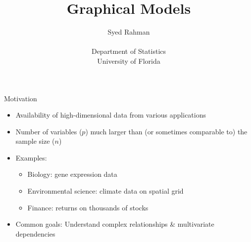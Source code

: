 \documentclass[xcolor=dvipsnames,aspectratio=1610]{beamer}
\title{Graphical Models}
\author{Syed Rahman\\\ \\
  \small Department of Statistics\\
  University of Florida}
\date{}
\theoremstyle{remark}
\begin{document}
{ %
  \begin{frame}[noframenumbering]
  \vspace{1cm}
    \titlepage
  \end{frame}
}





\begin{frame}{Motivation}
  \begin{itemize}
    \setlength{\itemsep}{10pt}
  \item Availability of high-dimensional data from various applications
  \item Number of variables ($p$) much larger than (or sometimes comparable to) the 
           sample size ($n$) 
  \item Examples:
    \begin{itemize}
      \setlength{\itemsep}{10pt}
    \item Biology: gene expression data
    \item Environmental science: climate data on spatial grid
    \item Finance: returns on thousands of stocks
    \end{itemize}
  \item Common goals: Understand complex relationships \& multivariate
      dependencies  
  \end{itemize}
\end{frame}
\end{document}
